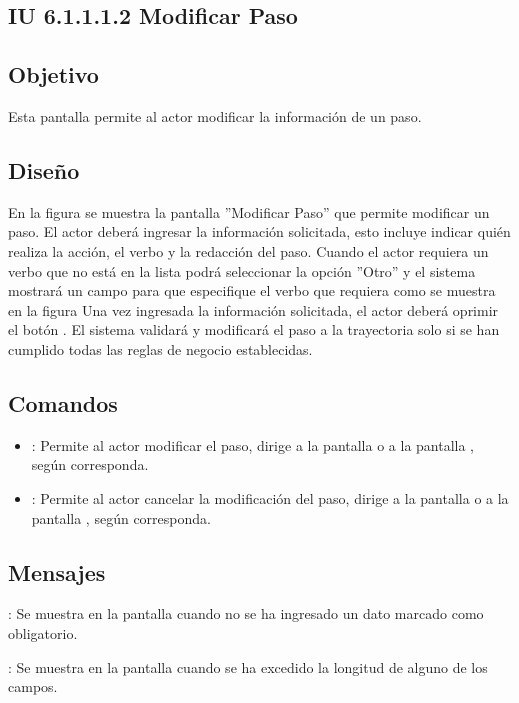 \subsection{IU 6.1.1.1.2 Modificar Paso}

\subsection{Objetivo}
	Esta pantalla permite al actor modificar la información de un paso.
\subsection{Diseño}
	En la figura  se muestra la pantalla ''Modificar Paso'' que permite modificar un paso. El actor deberá ingresar la información solicitada, esto incluye indicar quién realiza la acción, el verbo y la redacción del paso.
	Cuando el actor requiera un verbo que no está en la lista podrá seleccionar la opción ''Otro'' y el sistema mostrará un campo para que especifique el verbo que requiera como se muestra en la figura 
	Una vez ingresada la información solicitada, el actor deberá oprimir el botón  . El sistema validará y modificará el paso a la trayectoria solo si se han cumplido todas las reglas de negocio establecidas.

\subsection{Comandos}
\begin{itemize}
	\item {}: Permite al actor modificar el paso, dirige a la pantalla  o a la pantalla , según corresponda.
	\item {}: Permite al actor cancelar la modificación del paso, dirige a la pantalla  o a la pantalla , según corresponda.
\end{itemize}

\subsection{Mensajes}

\begin{Citemize}
	\item {}: Se muestra en la pantalla  cuando no se ha ingresado un dato marcado como obligatorio.
	\item {}: Se muestra en la pantalla  cuando se ha excedido la longitud de alguno de los campos.
\end{Citemize}
